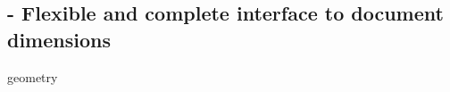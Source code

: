 
\subsection{ - Flexible and complete interface to document dimensions}

\begin{demo}{}{geometry}
  \geometry{
    hmargin = 20mm,
    paper   = a4paper,
    vmargin = 25mm,
  }
\end{demo}
